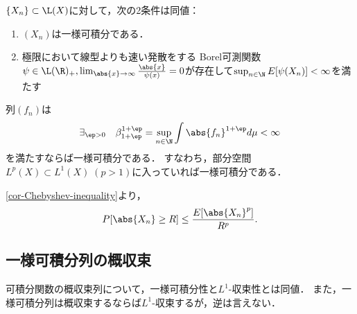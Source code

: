 \documentclass[uplatex,dvipdfmx]{jsreport}
\begin{document}
\begin{theorem}
    $\{X_n\}\subset\L(X)$に対して，次の2条件は同値：
    \begin{enumerate}
        \item $(X_n)$は一様可積分である．
        \item 極限において線型よりも速い発散をする
        Borel可測関数$\psi\in\L(\R)_+,\lim_{\abs{x}\to\infty}\frac{\abs{x}}{\psi(x)}=0$が存在して$\sup_{n\in\N}E[\psi(X_n)]<\infty$を満たす
    \end{enumerate}
\end{theorem}

\begin{corollary}[絶対積率が定める十分条件]
    列$(f_n)$は
    \[\exists_{\ep>0}\quad\beta_{1+\ep}^{1+\ep}=\sup_{n\in\N}\int\abs{f_n}^{1+\ep}d\mu<\infty\]
    を満たすならば一様可積分である．
    すなわち，部分空間$L^p(X)\subset L^1(X)\;(p>1)$に入っていれば一様可積分である．
\end{corollary}
\begin{Proof}
    \ref{cor-Chebyshev-inequality}より，
    \[P[\abs{X_n}\ge R]\le\frac{E[\abs{X_n}^p]}{R^p}.\]
\end{Proof}

\subsection{一様可積分列の概収束}

\begin{tcolorbox}[colframe=ForestGreen, colback=ForestGreen!10!white,breakable,colbacktitle=ForestGreen!40!white,coltitle=black,fonttitle=\bfseries\sffamily,
title=]
    可積分関数の概収束列について，一様可積分性と$L^1$-収束性とは同値．
    また，一様可積分列は概収束するならば$L^1$-収束するが，逆は言えない．
\end{tcolorbox}
\end{document}
